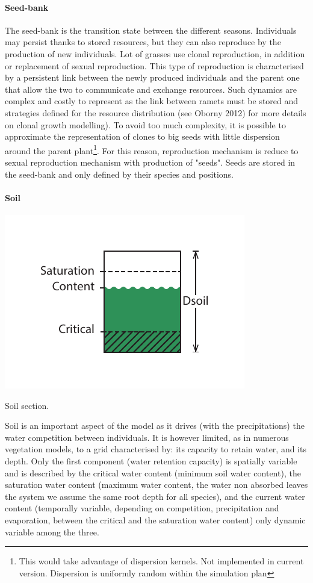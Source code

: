 \paragraph{Seed-bank} The seed-bank is the transition state between the different seasons. Individuals may persist thanks to stored resources, but they can also reproduce by the production of new individuals. Lot of grasses use clonal reproduction, in addition or replacement of sexual reproduction. This type of reproduction is characterised by a persistent link between the newly produced individuals and the parent one that allow the two to communicate and exchange resources. Such dynamics are complex and costly to represent as the link between ramets must be stored and strategies defined for the resource distribution (see Oborny 2012) for more details on clonal growth modelling). To avoid too much complexity, it is possible to approximate the representation of clones to big seeds with little dispersion around the parent plant\footnote{This would take advantage of dispersion kernels. Not implemented in current version. Dispersion is uniformly random within the simulation plan}. For this reason, reproduction mechanism is reduce to sexual reproduction mechanism with production of "seeds". Seeds are stored in the seed-bank and only defined by their species and positions. 

\paragraph{Soil}
\begin{marginfigure}
\includegraphics{./Figures/soil_section_m.pdf}
\caption{Soil section.}
\end{marginfigure}
Soil is an important aspect of the model as it drives (with the precipitations) the water competition between individuals. It is however limited, as in numerous vegetation models, to a grid characterised by: its capacity to retain water, and its depth. Only the first component (water retention capacity) is spatially variable and is described by the critical water content (minimum soil water content), the saturation water content (maximum water content, the water non absorbed leaves the system we assume the same root depth for all species), and the current water content (temporally variable, depending on competition, precipitation and evaporation, between the critical and the saturation water content) only dynamic variable among the three.

